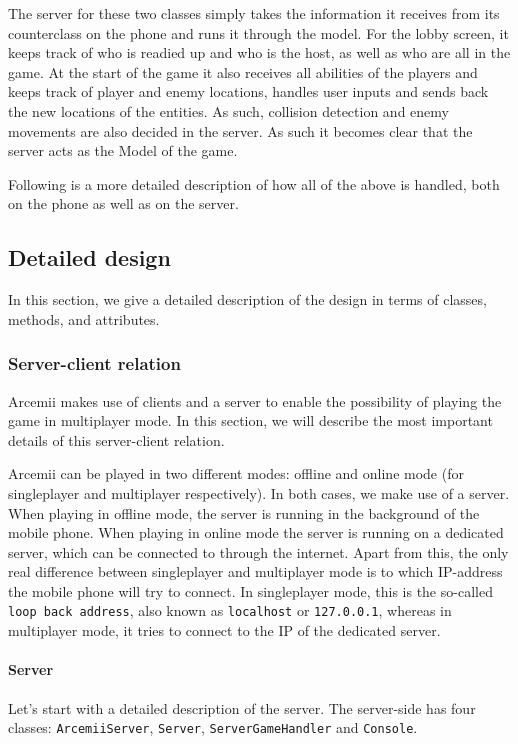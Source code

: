 \documentclass[../main.tex]{subfiles}
\begin{document}
		The server for these two classes simply takes the information it receives from its counterclass on the phone and runs it through the model. For the lobby screen, it keeps track of who is readied up and who is the host, as well as who are all in the game. At the start of the game it also receives all abilities of the players and keeps track of player and enemy locations, handles user inputs and sends back the new locations of the entities. As such, collision detection and enemy movements are also decided in the server. As such it becomes clear that the server acts as the Model of the game. 
		
		Following is a more detailed description of how all of the above is handled, both on the phone as well as on the server.
	\pagebreak
	\subsection{Detailed design}
	In this section, we give a detailed description of the design in terms of classes, methods, and attributes.

		\subsubsection{Server-client relation}
		Arcemii makes use of clients and a server to enable the possibility of playing the game in multiplayer mode. In this section, we will describe the most important details of this server-client relation.

		Arcemii can be played in two different modes: offline and online mode (for singleplayer and multiplayer respectively). In both cases, we make use of a server. When playing in offline mode, the server is running in the background of the mobile phone. When playing in online mode the server is running on a dedicated server, which can be connected to through the internet. Apart from this, the only real difference between singleplayer and multiplayer mode is to which IP-address the mobile phone will try to connect. In singleplayer mode, this is the so-called \texttt{loop back address}, also known as \texttt{localhost} or \texttt{127.0.0.1}, whereas in multiplayer mode, it tries to connect to the IP of the dedicated server. 

		\paragraph{Server} 
		Let's start with a detailed description of the server. The server-side has four classes: \texttt{ArcemiiServer}, \texttt{Server}, \texttt{ServerGameHandler} and \texttt{Console}. 
		
\end{document}
